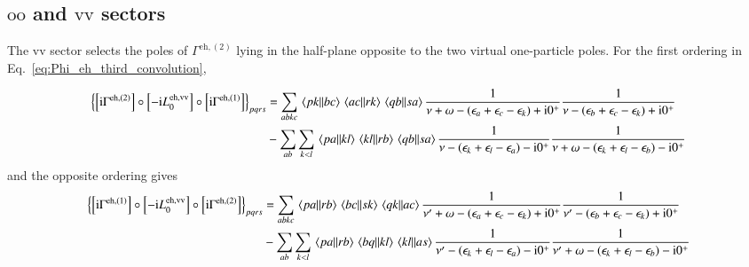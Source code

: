 \documentclass[aip,jcp,reprint,noshowkeys,superscriptaddress]{revtex4-1}
\newcommand{\eps}{\epsilon}
\newcommand{\ii}{\mathrm{i}}
\newcommand{\eh}{\text{eh}}
\begin{document}
\subsection{$\text{oo}$ and $\text{vv}$ sectors}

The $\text{vv}$ sector selects the poles of $\Gamma^{\eh,(2)}$ lying in the
half-plane opposite to the two virtual one-particle poles.
For the first ordering in Eq.~\eqref{eq:Phi_eh_third_convolution},
\begin{widetext}
\begin{equation}
    \begin{split}
    \left\{
    \left[\ii\Gamma^{\eh,(2)}\right]
    \circ\left[-\ii L_0^{\eh,\text{vv}}\right]
    \circ\left[\ii\Gamma^{\eh,(1)}\right]
    \right\}_{pqrs}
    & =
    \sum_{abkc}
    \mel{pk}{}{bc}\mel{ac}{}{rk}\mel{qb}{}{sa}
    \frac{1}{\nu+\omega-(\eps_a+\eps_c-\eps_k)+\ii0^+}
    \frac{1}{\nu-(\eps_b+\eps_c-\eps_k)+\ii0^+}
    \\
    &-
    \sum_{ab}\sum_{k<l}
    \mel{pa}{}{kl}\mel{kl}{}{rb}\mel{qb}{}{sa}
    \frac{1}{\nu-(\eps_k+\eps_l-\eps_a)-\ii0^+}
    \frac{1}{\nu+\omega-(\eps_k+\eps_l-\eps_b)-\ii0^+}
    \end{split}
    \label{eq:Phi_eh_third_vv_left}
\end{equation}
and the opposite ordering gives
\begin{equation}
    \begin{split}
    \left\{
    \left[\ii\Gamma^{\eh,(1)}\right]
    \circ\left[-\ii L_0^{\eh,\text{vv}}\right]
    \circ\left[\ii\Gamma^{\eh,(2)}\right]
    \right\}_{pqrs}
    & =
    \sum_{abkc}
    \mel{pa}{}{rb}\mel{bc}{}{sk}\mel{qk}{}{ac}
    \frac{1}{\nu'+\omega-(\eps_a+\eps_c-\eps_k)+\ii0^+}
    \frac{1}{\nu'-(\eps_b+\eps_c-\eps_k)+\ii0^+}
    \\
    &-
    \sum_{ab}\sum_{k<l}
    \mel{pa}{}{rb}\mel{bq}{}{kl}\mel{kl}{}{as}
    \frac{1}{\nu'-(\eps_k+\eps_l-\eps_a)-\ii0^+}
    \frac{1}{\nu'+\omega-(\eps_k+\eps_l-\eps_b)-\ii0^+}
    \end{split}
    \label{eq:Phi_eh_third_vv_right}
\end{equation}


\end{widetext}
\end{document}
